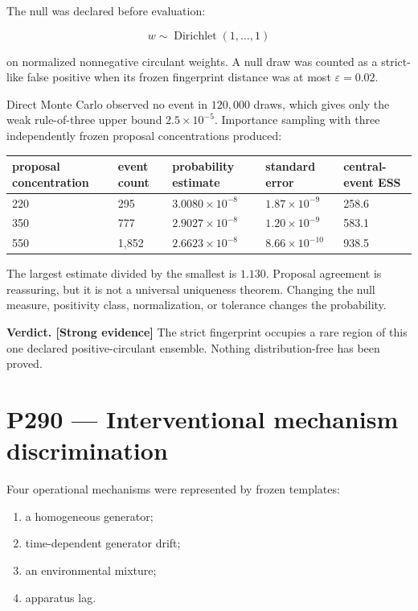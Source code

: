\documentclass[11pt,a4paper,openany]{report}
\newcommand{\statusStrong}{\textcolor{finblue}{[Strong evidence]}}
\begin{document}
The null was declared before evaluation:

\[
w\sim\operatorname{Dirichlet}(1,\ldots,1)
\]

on normalized nonnegative circulant weights. A null draw was counted as a strict-like false positive when its frozen fingerprint distance was at most \(\varepsilon=0.02\).

Direct Monte Carlo observed no event in \(120{,}000\) draws, which gives only the weak rule-of-three upper bound \(2.5\times10^{-5}\). Importance sampling with three independently frozen proposal concentrations produced:

\begin{center}
\begingroup\fontsize{7}{8.4}\selectfont
\setlength{\tabcolsep}{2.5pt}
\renewcommand{\arraystretch}{1.16}
\begin{longtable}{@{}p{}p{}p{}p{}p{}@{}}
\toprule
\textbf{proposal concentration} & \textbf{event count} & \textbf{probability estimate} & \textbf{standard error} & \textbf{central-event ESS} \\
\midrule
\endhead
220 & 295 & \(3.0080\times10^{-8}\) & \(1.87\times10^{-9}\) & 258.6 \\
350 & 777 & \(2.9027\times10^{-8}\) & \(1.20\times10^{-9}\) & 583.1 \\
550 & 1,852 & \(2.6623\times10^{-8}\) & \(8.66\times10^{-10}\) & 938.5 \\
\bottomrule
\end{longtable}
\endgroup
\end{center}

The largest estimate divided by the smallest is \(1.130\). Proposal agreement is reassuring, but it is not a universal uniqueness theorem. Changing the null measure, positivity class, normalization, or tolerance changes the probability.

\textbf{Verdict. \statusStrong{}} The strict fingerprint occupies a rare region of this one declared positive-circulant ensemble. Nothing distribution-free has been proved.

\chapter{P290 --- Interventional mechanism discrimination}

Four operational mechanisms were represented by frozen templates:

\begin{enumerate}
\item 
a homogeneous generator;

\item 
time-dependent generator drift;

\item 
an environmental mixture;

\item 
apparatus lag.

\end{enumerate}
\end{document}
